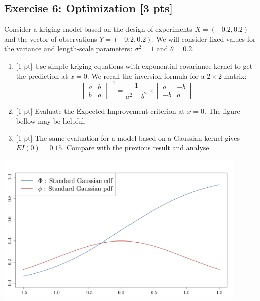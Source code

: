 \documentclass[a4paper,10pt]{article}
\begin{document}
\subsection*{Exercise 6: Optimization \hfill [3 pts]}

Consider a kriging model based on the design of experiments $X=(-0.2,0.2)$ and the vector of observations $Y=(-0.2,0.2)$. We will consider fixed values for the variance and length-scale parameters: $\sigma^2=1$ and $\theta=0.2$.
\begin{enumerate}[label=Q\arabic*.]
\item {[1 pt]} Use simple kriging equations with exponential covariance kernel to get
  the prediction at \(x=0\). We recall the inversion formula for a $2 \times 2$ matrix:
  \begin{equation}
  \left[ \begin{array}{ccc}  a & b \\ b & a   \end{array} \right] ^{-1} = \frac{1}{a^2-b^2} \times \left[ \begin{array}{ccc}  a & -b \\ -b & a   \end{array} \right]
  \end{equation}
\item {[1 pt]} Evaluate the Expected Improvement criterion at \(x=0\). The figure bellow may be helpful.
\item {[1 pt]} The same evaluation for a model based on a Gaussian kernel gives $EI(0) = 0.15$. Compare with the previous result and analyse.
  \end{enumerate}

\begin{center}
  \includegraphics[width=12cm]{figures/exo_optim.pdf}
\end{center}
\end{document}
